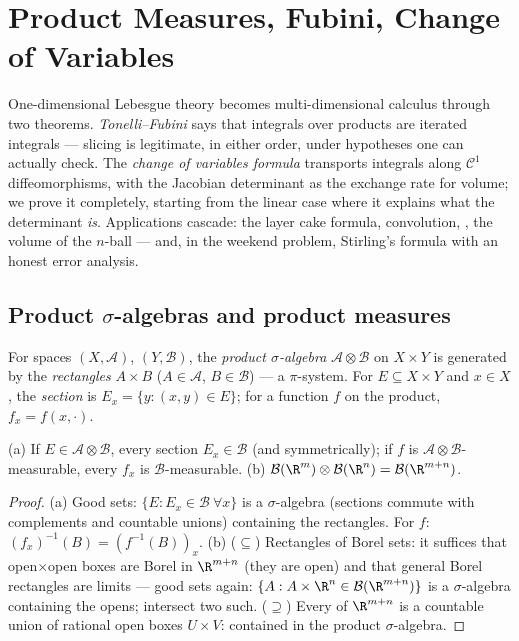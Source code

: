 \chapter{Product Measures, Fubini, Change of Variables}
\label{ch:b3:product}

One-dimensional Lebesgue theory becomes multi-dimensional
calculus through two theorems. \emph{Tonelli--Fubini} says that
integrals over products are iterated integrals --- slicing is
legitimate, in either order, under hypotheses one can actually
check. The \emph{change of variables formula} transports
integrals along $\mathcal C^1$ diffeomorphisms, with the
Jacobian determinant as the exchange rate for volume; we prove
it completely, starting from the linear case where it explains
what the determinant \emph{is}. Applications cascade: the layer
cake formula, convolution, , the volume of the
$n$-ball --- and, in the weekend problem, Stirling's formula
with an honest error analysis.

\section{Product $\sigma$-algebras and product measures}

\begin{definition}\label{def:b3:product:sigma}
For  spaces $(X, \mathcal A)$, $(Y, \mathcal B)$, the
\emph{product $\sigma$-algebra} $\mathcal A \otimes \mathcal B$ on $X \times
Y$ is generated by the \emph{rectangles} $A \times B$ ($A \in
\mathcal A$, $B \in \mathcal B$) --- a $\pi$-system. For $E
\subseteq X\times Y$ and $x \in X$, the \emph{section} is $E_x
= \{y : (x,y) \in E\}$; for a function $f$ on the product,
$f_x = f(x, \cdot)$.
\end{definition}

\begin{proposition}\label{prop:b3:product:sections}
(a) If $E \in \mathcal A\otimes\mathcal B$, every section $E_x
\in \mathcal B$ (and symmetrically); if $f$ is $\mathcal
A\otimes\mathcal B$-measurable, every $f_x$ is $\mathcal
B$-measurable.
(b) $\mathcal B(\R^m)\otimes\mathcal B(\R^n) = \mathcal
B(\R^{m+n})$.
\end{proposition}

\begin{proof}
(a) Good sets: $\{E : E_x \in \mathcal B\ \forall x\}$ is a
$\sigma$-algebra (sections commute with complements and
countable unions) containing the rectangles. For $f$:
$(f_x)^{-1}(B) = (f^{-1}(B))_x$.
(b) ($\subseteq$) Rectangles of Borel sets: it suffices that
open$\times$open boxes are Borel in $\R^{m+n}$ (they are open)
and that general Borel rectangles are limits --- good sets
again: $\{A : A\times\R^n \in \mathcal B(\R^{m+n})\}$ is a
$\sigma$-algebra containing the opens; intersect two such.
($\supseteq$) Every  of $\R^{m+n}$ is a countable union
of rational open boxes $U\times V$: contained in the product
$\sigma$-algebra.
\end{proof}

